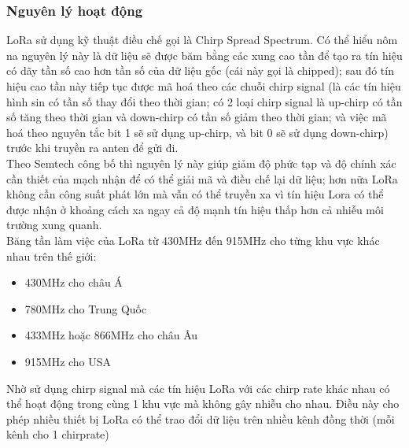 \subsubsection{Nguyên lý hoạt động}
LoRa sử dụng kỹ thuật điều chế gọi là Chirp Spread Spectrum. Có thể hiểu nôm na nguyên lý này là dữ liệu sẽ được băm bằng các xung cao tần để tạo ra tín hiệu có dãy tần số cao hơn tần số của dữ liệu gốc (cái này gọi là chipped); sau đó tín hiệu cao tần này tiếp tục được mã hoá theo các chuỗi chirp signal (là các tín hiệu hình sin có tần số thay đổi theo thời gian; có 2 loại chirp signal là up-chirp có tần số tăng theo thời gian và down-chirp có tần số giảm theo thời gian; và việc mã hoá theo nguyên tắc bit 1 sẽ sử dụng up-chirp, và bit 0 sẽ sử dụng down-chirp) trước khi truyền ra anten để gửi đi.\\
\indent Theo Semtech công bố thì nguyên lý này giúp giảm độ phức tạp và độ chính xác cần thiết của mạch nhận để có thể giải mã và điều chế lại dữ liệu; hơn nữa LoRa không cần công suất phát lớn mà vẫn có thể truyền xa vì tín hiệu Lora có thể được nhận ở khoảng cách xa ngay cả độ mạnh tín hiệu thấp hơn cả nhiễu môi trường xung quanh.\\
\indent Băng tần làm việc của LoRa từ 430MHz đến 915MHz cho từng khu vực khác nhau trên thế giới:
\begin{itemize}
	\item 430MHz cho châu Á
	\item 780MHz cho Trung Quốc
	\item 433MHz hoặc 866MHz cho châu Âu
	\item 915MHz cho USA
\end{itemize}

\indent Nhờ sử dụng chirp signal mà các tín hiệu LoRa với các chirp rate khác nhau có thể hoạt động trong cùng 1 khu vực mà không gây nhiễu cho nhau. Điều này cho phép nhiều thiết bị LoRa có thể trao đổi dữ liệu trên nhiều kênh đồng thời (mỗi kênh cho 1 chirprate)
